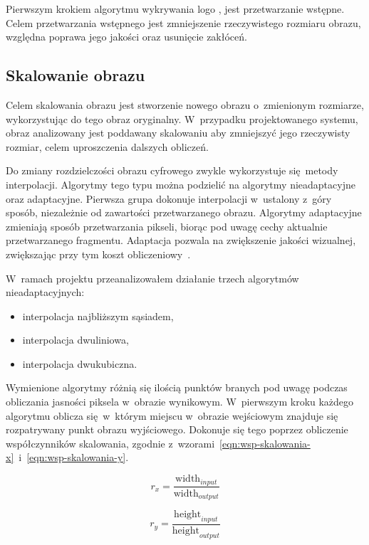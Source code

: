 Pierwszym krokiem algorytmu wykrywania logo \bk, jest przetwarzanie wstępne. Celem przetwarzania wstępnego jest zmniejszenie rzeczywistego rozmiaru obrazu, względna poprawa jego jakości oraz usunięcie zakłóceń.

\subsection{Skalowanie obrazu}
Celem skalowania obrazu jest stworzenie nowego obrazu o~zmienionym rozmiarze, wykorzystując do tego obraz oryginalny. W~przypadku projektowanego systemu, obraz analizowany jest poddawany skalowaniu aby zmniejszyć jego rzeczywisty rozmiar, celem uproszczenia dalszych obliczeń.

Do zmiany rozdzielczości obrazu cyfrowego zwykle wykorzystuje się metody interpolacji. Algorytmy tego typu można podzielić na algorytmy nieadaptacyjne oraz adaptacyjne. Pierwsza grupa dokonuje interpolacji w~ustalony z~góry sposób, niezależnie od zawartości przetwarzanego obrazu. Algorytmy adaptacyjne zmieniają sposób przetwarzania pikseli, biorąc pod uwagę cechy aktualnie przetwarzanego fragmentu. Adaptacja pozwala na zwiększenie jakości wizualnej, zwiększając przy tym koszt obliczeniowy~\cite{swierczynski2008podwyzszanie}.

W~ramach projektu przeanalizowałem działanie trzech algorytmów nieadaptacyjnych: 
\begin{itemize}
    \item interpolacja najbliższym sąsiadem,
    \item interpolacja dwuliniowa,
    \item interpolacja dwukubiczna.
\end{itemize}

Wymienione algorytmy różnią się ilością punktów branych pod uwagę podczas obliczania jasności piksela w~obrazie wynikowym. W~pierwszym kroku każdego algorytmu oblicza się w~którym miejscu w~obrazie wejściowym znajduje się rozpatrywany punkt obrazu wyjściowego. Dokonuje się tego poprzez obliczenie współczynników skalowania, zgodnie z~wzorami~\ref{eqn:wsp-skalowania-x}~i~\ref{eqn:wsp-skalowania-y}.

\begin{equation}
    \label{eqn:wsp-skalowania-x}
    r_{x} = \frac{\mathrm{width}_{input}}{\mathrm{width}_{output}}
\end{equation}

\begin{equation}
    \label{eqn:wsp-skalowania-y}
    r_{y} = \frac{\mathrm{height}_{input}}{\mathrm{height}_{output}}
\end{equation}

